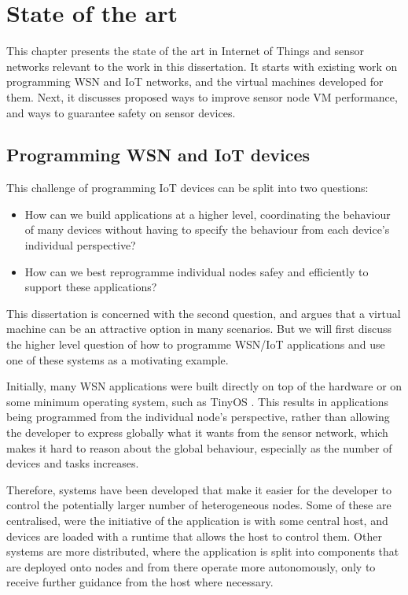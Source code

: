 \chapter{State of the art}
This chapter presents the state of the art in Internet of Things and sensor networks relevant to the work in this dissertation. It starts with existing work on programming WSN and IoT networks, and the virtual machines developed for them. Next, it discusses proposed ways to improve sensor node VM performance, and ways to guarantee safety on sensor devices.

\section{Programming WSN and IoT devices}

This challenge of programming IoT devices can be split into two questions:

\begin{itemize}
    \item How can we build applications at a higher level, coordinating the behaviour of many devices without having to specify the behaviour from each device's individual perspective?
    \item How can we best reprogramme individual nodes safey and efficiently to support these applications?
\end{itemize}

This dissertation is concerned with the second question, and argues that a virtual machine can be an attractive option in many scenarios. But we will first discuss the higher level question of how to programme WSN/IoT applications and use one of these systems as a motivating example.

Initially, many WSN applications were built directly on top of the hardware or on some minimum operating system, such as TinyOS \cite{Levis:2004ws}. This results in applications being programmed from the individual node's perspective, rather than allowing the developer to express globally what it wants from the sensor network, which makes it hard to reason about the global behaviour, especially as the number of devices and tasks increases.

Therefore, systems have been developed that make it easier for the developer to control the potentially larger number of heterogeneous nodes. Some of these are centralised, were the initiative of the application is with some central host, and devices are loaded with a runtime that allows the host to control them. Other systems are more distributed, where the application is split into components that are deployed onto nodes and from there operate more autonomously, only to receive further guidance from the host where necessary.

